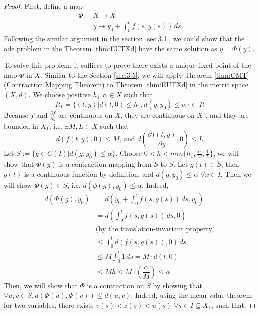 \documentclass{article}
\theoremstyle{definition}
\theoremstyle{remark}
\theoremstyle{example}
\begin{document}
\begin{proof}
    \cite{r_kent_nagle_fundamentals_2011}First, define a map 
    \begin{align}
        \Phi: \,&X \rightarrow X\\
        &y \mapsto y_0 + \int_{0}^{t}f(s,y(s))\,ds
    \end{align}
    Following the similar argument in the section \ref{sec:3.1}, we could show that the ode problem in the Theorem \ref{thm:EUTXd} have the same solution as $y = \Phi(y)$.
    
    To solve this problem, it suffices to prove there exists a unique fixed point of the map $\Phi$ in $X$. Similar to the Section \ref{sec:3.5}, we will apply Theorem \ref{thm:CMT} (Contraction Mapping Theorem) to Theorem \ref{thm:EUTXd} in the metric space $(X,d)$. We choose positive $h_1, \alpha \in X$ such that 
    \begin{equation}
        R_1 = \{(t,y) \lvert d(t,0) \leq h_1, d(y, y_0) \leq \alpha\} \subset R
    \end{equation}
    Because $f$ and $\tfrac{\partial f}{\partial y}$ are continuous on $X$, they are continuous on $X_1$, and they are bounded in $X_1$; i.e. $\exists M, L \in X$ such that 
    \begin{equation}
        d(f(t,y),0) \leq M \text{, and } d\left(\dfrac{\partial f(t,y)}{\partial y},0\right) \leq L
    \end{equation}
    Let $S := \{g \in C(I)\lvert d(g,y_0) \leq \alpha\}$. Choose $0 < h < min\{h_1, \tfrac{\alpha}{M},\tfrac{1}{L}\}$, we will show that $\Phi(y)$ is a contraction mapping from $S$ to $S$. Let $g(t) \in S$, then $g(t)$ is a continuous function by definition, and $d(g,y_0) \leq \alpha \; \forall x \in I$. Then we will show $\Phi(g) \in S$, i.e. $d(\phi(g),y_0) \leq \alpha$. Indeed,
    \begin{align}
        d(\Phi(g),y_0) &= d\left(y_0+\int_{0}^{t}{f(s,g(s))}\,ds,y_0\right)\\
        &=d\left(\int_{0}^{t}{f(s,g(s))}\,ds,0\right)\\
        &\text{(by the translation-invariant property)}\\
        &\leq \int_{0}^{t}{d\left(f(s,g(s)),0\right)}\,ds\\
        &\leq M \int_{0}^{t}{1}\,ds = M\cdot d(t,0)\\
        &\leq Mh \leq M\cdot (\dfrac{\alpha}{M}) \leq \alpha
    \end{align}
    Then, we will show that $\Phi$ is a contraction on $S$ by showing that $\forall u,v \in S, d(\Phi(u),\Phi(v)) \leq d(u,v)$. Indeed, using the mean value theorem for two variables, there exists $v(s) < z(s) < u(s) \; \forall s \in I \subseteq X_1$, such that:

\end{proof}
\end{document}
